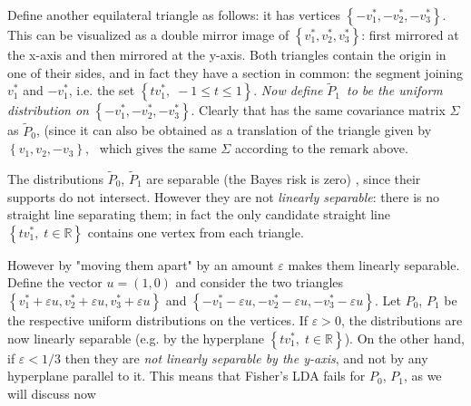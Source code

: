 \documentclass[11pt,twoside]{article}%
\theoremstyle{change}
\begin{document}
Define another equilateral triangle as follows: it has vertices $\left\{
-v_{1}^{\ast},-v_{2}^{\ast},-v_{3}^{\ast}\right\}  $. This can be visualized
as a double mirror image of $\left\{  v_{1}^{\ast},v_{2}^{\ast},v_{3}^{\ast
}\right\}  $: first mirrored at the x-axis and then mirrored at the y-axis.
Both triangles contain the origin in one of their sides, and in fact they have
a section in common: the segment joining $v_{1}^{\ast}$ and $-v_{1}^{\ast}$,
i.e. the set $\left\{  tv_{1}^{\ast},\;-1\leq t\leq1\right\}  .$ \textit{Now
define }$\tilde{P}_{1}$\textit{\ to be the uniform distribution on }$\left\{
-v_{1}^{\ast},-v_{2}^{\ast},-v_{3}^{\ast}\right\}  $. Clearly that has the
same covariance matrix $\Sigma$ as $\tilde{P}_{0}$, (since it can also be
obtained as a translation of the triangle given by $\left\{  v_{1}%
,v_{2},-v_{3}\right\}  $, \textit{\ }which gives the same $\Sigma$ according
to the remark above.

The distributions $\tilde{P}_{0}$, $\tilde{P}_{1}$ are separable (the Bayes
risk is zero) , since their supports do not intersect. However they are not
\textit{linearly separable}: there is no straight line separating them; in
fact the only candidate straight line $\left\{  tv_{1}^{\ast},\;t\in
\mathbb{R}\right\}  $ contains one vertex from each triangle.

However by "moving them apart" by an amount $\varepsilon$ makes them linearly
separable. Define the vector $u=\left(  1,0\right)  $ and consider the two
triangles $\left\{  v_{1}^{\ast}+\varepsilon u,v_{2}^{\ast}+\varepsilon
u,v_{3}^{\ast}+\varepsilon u\right\}  $ and $\left\{  -v_{1}^{\ast
}-\varepsilon u,-v_{2}^{\ast}-\varepsilon u,-v_{3}^{\ast}-\varepsilon
u\right\}  $. Let $P_{0}$, $P_{1}$ be the respective uniform distributions on
the vertices. If $\varepsilon>0$, the distributions are now linearly separable
(e.g. by the hyperplane $\left\{  tv_{1}^{\ast},\;t\in\mathbb{R}\right\}  $).
On the other hand, if $\varepsilon<1/3$ then they are \textit{not linearly
separable by the y-axis}, and not by any hyperplane parallel to it. This means
that Fisher's LDA fails for $P_{0}$, $P_{1}$, as we will discuss now

\bigskip
\end{document}
